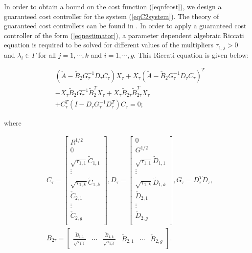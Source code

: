 \documentclass[twocolumn]{autart}
\begin{document}
\noindent In order to obtain a bound on the cost function (\ref{eqnfcost}), we design a guaranteed cost controller for the system (\ref{eqC2system}). The theory of guaranteed cost controllers can be found in \cite{IP}. 
In order to apply a guaranteed cost controller of the form (\ref{eqnestimator}), a parameter dependent algebraic Riccati equation is required to be solved for different values of the multipliers $\tau_{1,j}>0$ and $\lambda_i \in \Gamma$ for all $j=1,\cdots,k$  and $i=1,\cdots,g$. This Riccati equation is given below:
\begin{small}
\begin{equation}
\label{eqARE}
\begin{split}
&(\check{A}-\check{B}_2 G_{\tau}^{-1} D_{\tau} C_{\tau}) X_\tau+ X_\tau (\check{A}-\check{B}_2 G_{\tau}^{-1} D_{\tau} C_{\tau})^T\\
&-X_\tau \tilde{B}_2 G_{\tau}^{-1} \tilde{B}_2^T X_\tau + X_\tau \tilde{B}_{2\tau} \tilde{B}_{2\tau}^T X_\tau\\
&+ C_\tau^T (I-D_\tau G_{\tau}^{-1} D_\tau^T) C_\tau=0;
\end{split}
\end{equation}
\end{small}
where
\begin{small}
\begin{equation}
\label{eqdefAREs}
\begin{split}
&C_\tau=\left[
\begin{array}{c}
R^{1/2}\\
0\\
\sqrt{\tau_{1,1}} \tilde{C}_{1,1}\\
\vdots\\
\sqrt{\tau_{1,k}} \tilde{C}_{1,k}\\
 \check{C}_{2,1}\\
\vdots\\
 \check{C}_{2,g}\\
\end{array}\right],D_\tau=\left[
\begin{array}{c}
0\\
G^{1/2}\\
\sqrt{\tau_{1,1}} \tilde{D}_{1,1}\\
\vdots\\
\sqrt{\tau_{1,k}} \tilde{D}_{1,k}\\
 \check{D}_{2,1}\\
\vdots\\
 \check{D}_{2,g}\\
\end{array}\right],G_\tau=D_\tau^T D_\tau,\\
&B_{2\tau} = \left[
\begin{array}{cccccc}
\frac{\tilde{B}_{1,1}}{\sqrt{\tau_{1,1}}} &  \cdots & \frac{\tilde{B}_{1,k}}{\sqrt{\tau_{1,k}}} & \check{B}_{2,1} &  \cdots & \check{B}_{2,g}
\end{array}\right].
\end{split}
\end{equation}
\end{small}
\end{document}
